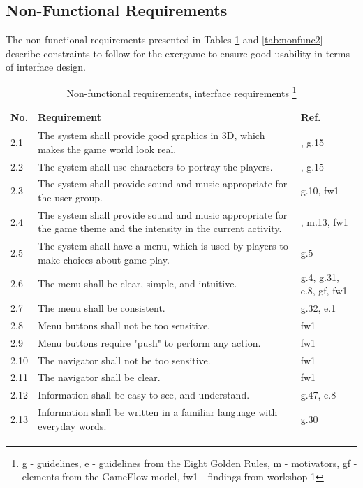 \subsection{Non-Functional Requirements}
The non-functional requirements presented in Tables \ref{tab:nfunc1} and \ref{tab:nonfunc2} describe constraints to follow for the exergame to ensure good usability in terms of interface design.

\begin{minipage}{12 cm}
\begin{table} [H]
\centering
\begin{tabular}{|>{\raggedright}p{}|p{}|p{}|} 
\hline
\textbf{No.} & \textbf{Requirement} & \textbf{Ref.} \\ \hline
2.1 & The system shall provide good graphics in 3D, which makes the game world look real. & \cite{understandingvg}, g.15 \\ \hline
2.2 & The system shall use characters to portray the players. & \cite{understandingvg}, g.15 \\ \hline
2.3 & The system shall provide sound and music appropriate for the user group. & g.10, fw1 \\ \hline
2.4 & The system shall provide sound and music appropriate for the game theme and the intensity in the current activity. & \cite{umlapproach}, m.13, fw1 \\ \hline
2.5 & The system shall have a menu, which is used by players to make choices about game play. & g.5\\ \hline
2.6 & The menu shall be clear, simple, and intuitive. & g.4, g.31, e.8, gf, fw1 \\ \hline
2.7 & The menu shall be consistent. & g.32, e.1 \\ \hline
2.8 & Menu buttons shall not be too sensitive. & fw1 \\ \hline
2.9 & Menu buttons require "push" to perform any action. & fw1\\ \hline
2.10 & The navigator shall not be too sensitive. & fw1\\ \hline
2.11 & The navigator shall be clear. & fw1\\ \hline
2.12 & Information shall be easy to see, and understand. & g.47, e.8\\ \hline
2.13 & Information shall be written in a familiar language with everyday words. & g.30\\ \hline
\end{tabular}
\caption[Non-functional requirements, part 1]{Non-functional requirements, interface requirements \footnote{g - guidelines, e - guidelines from the Eight Golden Rules, m - motivators, gf - elements from the GameFlow model, fw1 - findings from workshop 1}}
\label{tab:nfunc1}
\end{table} 
\end{minipage}

